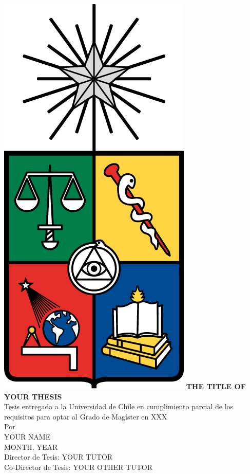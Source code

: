 \begin{titlepage}
    \centering
    \includegraphics[width=0.15\linewidth,center]{Thesis/Manuscript/Images/Frontmatter/uchilelogo.jpg}\vspace{0.1cm}
    \MakeUppercase{\Large\textbf{The title of your thesis}}\\
    \vspace{0.5cm}
    Tesis entregada
    a la Universidad de Chile
    en cumplimiento parcial de los requisitos
    para optar al Grado de Magíster en XXX \\  \vspace{0.5cm}
    Por \\
    YOUR NAME \\
    MONTH, YEAR\\
    Director de Tesis: YOUR TUTOR \\
    Co-Director de Tesis: YOUR OTHER TUTOR\\
    \vspace{1cm}

\end{titlepage}
\clearpage

